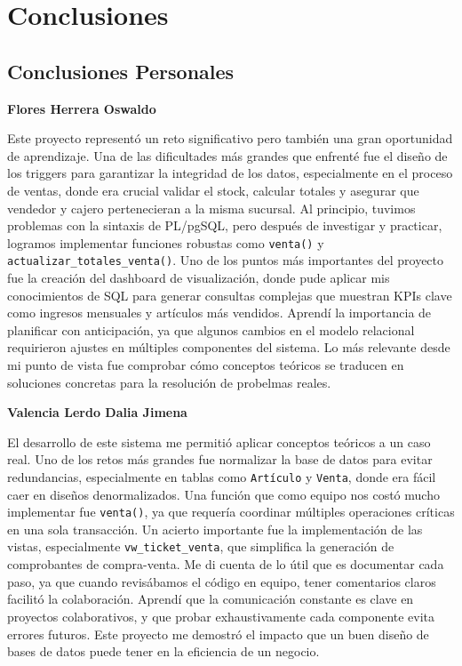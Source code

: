 \documentclass[a4paper, 12pt]{article}
\begin{document}
\section{Conclusiones}

\subsection{Conclusiones Personales}

\textbf{Flores Herrera Oswaldo}

Este proyecto representó un reto significativo pero también una gran oportunidad de aprendizaje. Una de las dificultades más grandes que enfrenté fue el diseño de los triggers para garantizar la integridad de los datos, especialmente en el proceso de ventas, donde era crucial validar el stock, calcular totales y asegurar que vendedor y cajero pertenecieran a la misma sucursal. Al principio, tuvimos problemas con la sintaxis de PL/pgSQL, pero después de investigar y practicar, logramos implementar funciones robustas como \texttt{venta()} y \texttt{actualizar\_totales\_venta()}.
\vspace{5mm}
Uno de los puntos más importantes del proyecto fue la creación del dashboard de visualización, donde pude aplicar mis conocimientos de SQL para generar consultas complejas que muestran KPIs clave como ingresos mensuales y artículos más vendidos. Aprendí la importancia de planificar con anticipación, ya que algunos cambios en el modelo relacional requirieron ajustes en múltiples componentes del sistema. Lo más relevante desde mi punto de vista fue comprobar cómo conceptos teóricos  se traducen en soluciones concretas para la resolución de probelmas reales.

\vspace{5mm}

\textbf{Valencia Lerdo Dalia Jimena}

El desarrollo de este sistema me permitió aplicar conceptos teóricos a un caso real. Uno de los retos más grandes fue normalizar la base de datos para evitar redundancias, especialmente en tablas como \texttt{Artículo} y \texttt{Venta}, donde era fácil caer en diseños denormalizados. Una función que como equipo nos costó mucho implementar fue \texttt{venta()}, ya que requería coordinar múltiples operaciones críticas en una sola transacción.
\vspace{5mm}
Un acierto importante fue la implementación de las vistas, especialmente \texttt{vw\_ticket\_venta}, que simplifica la generación de comprobantes de compra-venta. Me di cuenta de lo útil que es documentar cada paso, ya que cuando revisábamos el código en equipo, tener comentarios claros facilitó la colaboración. Aprendí que la comunicación constante es clave en proyectos colaborativos, y que probar exhaustivamente cada componente evita errores futuros. Este proyecto me demostró el impacto que un buen diseño de bases de datos puede tener en la eficiencia de un negocio.
\end{document}
